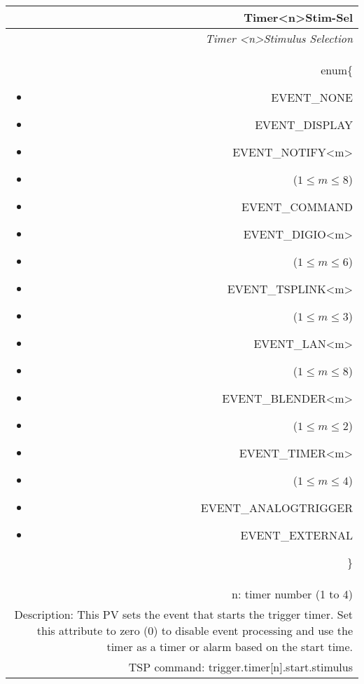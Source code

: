 \documentclass[openany]{article}
\begin{document}
		\begin{tabular}{N}
			\hline
			\bfseries Timer{\textless n\textgreater}Stim-Sel\label{pv:timerstim-sel} \\ \hline
			\emph{Timer \textless n\textgreater Stimulus Selection} \\
			enum\{\begin{itemize}[noitemsep]
				\small
				\item[] EVENT\_NONE
				\item[] EVENT\_DISPLAY
				\item[] EVENT\_NOTIFY\textless m\textgreater
				\item[] ($1\leq m\leq 8$)
				\item[] EVENT\_COMMAND
				\item[] EVENT\_DIGIO\textless m\textgreater
				\item[] ($1\leq m\leq 6$)
				\item[] EVENT\_TSPLINK\textless m\textgreater
				\item[] ($1\leq m\leq 3$)
				\item[] EVENT\_LAN\textless m\textgreater
				\item[] ($1\leq m\leq 8$)
				\item[] EVENT\_BLENDER\textless m\textgreater 
				\item[] ($1\leq m\leq 2$)
				\item[] EVENT\_TIMER\textless m\textgreater
				\item[] ($1\leq m\leq 4$)
				\item[] EVENT\_ANALOGTRIGGER
				\item[] EVENT\_EXTERNAL
			\end{itemize}\} \\
			n: timer number (1 to 4) \\
			Description: This PV sets the event that starts the trigger timer. Set this attribute to zero (0) to disable event processing and use the timer as a timer or alarm based on the start time. \\
			TSP command: trigger.timer[n].start.stimulus
		\end{tabular}
\end{document}
